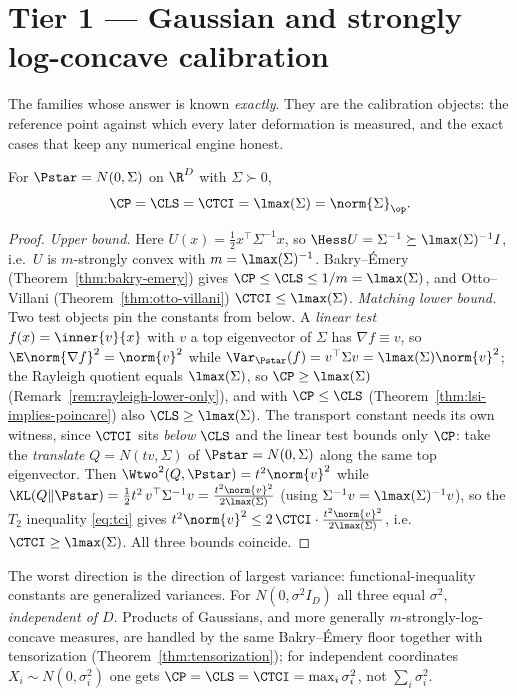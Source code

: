 \documentclass[../main.tex]{subfiles}
\begin{document}
\section{Tier 1 --- Gaussian and strongly log-concave calibration}
\label{sec:tier1}

The families whose answer is known \emph{exactly}. They are the calibration objects: the
reference point against which every later deformation is measured, and the exact cases that
keep any numerical engine honest.

\begin{family}
\label{fam:gaussian-covariance}
For $\Pstar=N(0,\Sigma)$ on $\R^D$ with $\Sigma\succ0$,
\[
  \CP=\CLS=\CTCI=\lmax(\Sigma)=\norm{\Sigma}_\op .
\]
\end{family}

\begin{proof}
\emph{Upper bound.} Here $U(x)=\tfrac12 x^\top\Sigma^{-1}x$, so
$\Hess U=\Sigma^{-1}\succeq\lmax(\Sigma)^{-1}I$, i.e.\ $U$ is $m$-strongly convex with
$m=\lmax(\Sigma)^{-1}$. Bakry--\'Emery (Theorem~\ref{thm:bakry-emery}) gives
$\CP\le\CLS\le1/m=\lmax(\Sigma)$, and Otto--Villani (Theorem~\ref{thm:otto-villani})
$\CTCI\le\lmax(\Sigma)$.
\emph{Matching lower bound.} Two test objects pin the constants from below. A \emph{linear
test} $f(x)=\inner{v}{x}$ with $v$ a top eigenvector of $\Sigma$ has $\nabla f\equiv v$, so
$\E\norm{\nabla f}^2=\norm{v}^2$ while $\Var_{\Pstar}(f)=v^\top\Sigma v=\lmax(\Sigma)\norm{v}^2$;
the Rayleigh quotient equals $\lmax(\Sigma)$, so $\CP\ge\lmax(\Sigma)$
(Remark~\ref{rem:rayleigh-lower-only}), and with $\CP\le\CLS$
(Theorem~\ref{thm:lsi-implies-poincare}) also $\CLS\ge\lmax(\Sigma)$. The transport constant
needs its own witness, since $\CTCI$ sits \emph{below} $\CLS$ and the linear test bounds only
$\CP$: take the \emph{translate} $Q=N(tv,\Sigma)$ of $\Pstar=N(0,\Sigma)$ along the same top
eigenvector. Then $\Wtwo^2(Q,\Pstar)=t^2\norm{v}^2$ while
$\KL(Q\|\Pstar)=\tfrac12 t^2\,v^\top\Sigma^{-1}v=\tfrac{t^2\norm{v}^2}{2\lmax(\Sigma)}$ (using
$\Sigma^{-1}v=\lmax(\Sigma)^{-1}v$), so the $T_2$ inequality \eqref{eq:tci} gives
$t^2\norm{v}^2\le2\,\CTCI\cdot\tfrac{t^2\norm{v}^2}{2\lmax(\Sigma)}$, i.e.\
$\CTCI\ge\lmax(\Sigma)$. All three bounds coincide.
\end{proof}

\noindent The worst direction is the direction of largest variance: functional-inequality
constants are generalized variances. For $N(0,\sigma^2 I_D)$ all three equal $\sigma^2$,
\emph{independent of $D$}. Products of Gaussians, and more generally $m$-strongly-log-concave
measures, are handled by the same Bakry--\'Emery floor together with tensorization
(Theorem~\ref{thm:tensorization}); for independent coordinates $X_i\sim N(0,\sigma_i^2)$ one
gets $\CP=\CLS=\CTCI=\max_i\sigma_i^2$, not $\sum_i\sigma_i^2$.
\end{document}
